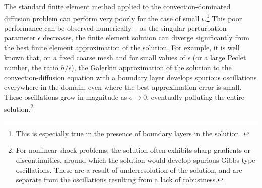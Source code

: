 The standard finite element method applied to the convection-dominated diffusion problem can perform very poorly for the case of small $\epsilon$.\footnote{This is especially true in the presence of boundary layers in the solution \cite{roos2008robust}.}  This poor performance can be observed numerically -- as the singular perturbation parameter $\epsilon$ decreases, the finite element solution can diverge significantly from the best finite element approximation of the solution.  
For example, it is well known that, on a fixed coarse mesh and for small values of $\epsilon$ (or a large Peclet number, the ratio $h/\epsilon$), the Galerkin approximation of the solution to the convection-diffusion equation with a boundary layer develops spurious oscillations everywhere in the domain, even where the best approximation error is small.  These oscillations grow in magnitude as $\epsilon \rightarrow 0$, eventually polluting the entire solution.\footnote{For nonlinear shock problems, the solution often exhibits sharp gradients or discontinuities, around which the solution would develop spurious Gibbs-type oscillations. These are a result of underresolution of the solution, and are separate from the oscillations resulting from a lack of robustness.}  

